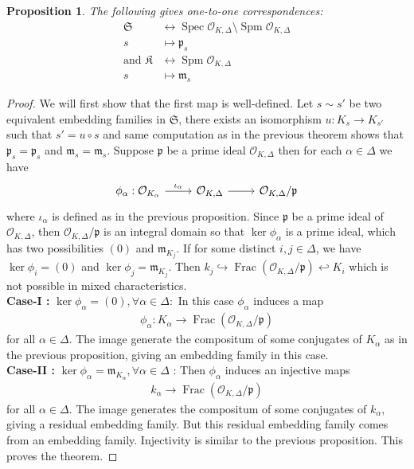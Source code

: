\documentclass[12pts,a4paper]{amsart}
\newtheorem{proposition}{Proposition}[section]
\DeclareMathOperator{\Frac}{Frac}
\DeclareMathOperator{\spm}{Spm}
\DeclareMathOperator{\spec}{Spec}
\begin{document}
\begin{proposition}\label{Prime ideal prop of Delta fields}
	The following gives one-to-one correspondences:
	\begin{align*}
		\mathfrak{S}&\leftrightarrow \spec\mathcal{O}_{K,\Delta}\setminus\spm\mathcal{O}_{K,\Delta}\\
		                  s &\mapsto \mathfrak{p}_s\\
	 \text{and  }	\mathfrak{K}&\leftrightarrow \spm\mathcal{O}_{K,\Delta}\\
		                  s &\mapsto \mathfrak{m}_s
	\end{align*}
\end{proposition}

\begin{proof}
	We will first show that the first map is well-defined. Let $s\sim s'$ be two equivalent embedding families in $\mathfrak{S}$, there exists an isomorphism $u: K_s\to K_{s'}$ such that $s'=u\circ s$ and same computation as in the previous theorem shows that $\mathfrak{p}_s=\mathfrak{p}_s$ and $\mathfrak{m}_s=\mathfrak{m}_s$. Suppose $\mathfrak{p}$ be a prime ideal $\mathcal{O}_{K,\Delta}$ then for each $\alpha\in\Delta$ we have 
	\[
	\begin{tikzcd}
	  \phi_\alpha:\mathcal{O}_{K_\alpha}\arrow[r,"\iota_\alpha"]& \mathcal{O}_{K,\Delta}\arrow[r]& \mathcal{O}_{K,\Delta}/\mathfrak{p}
	\end{tikzcd}
	\]
	where $\iota_\alpha$ is defined as in the previous proposition. Since $\mathfrak{p}$ be a prime ideal of $\mathcal{O}_{K,\Delta}$, then $\mathcal{O}_{K,\Delta}/\mathfrak{p}$ is an integral domain so that $\ker\phi_\alpha$ is a prime ideal, which has two possibilities $(0)$ and $\mathfrak{m}_{K_j}$. If for some distinct $i,j\in\Delta$, we have $\ker\phi_i=(0)$ and $\ker\phi_j=\mathfrak{m}_{K_j}$. Then $k_j\hookrightarrow\Frac(\mathcal{O}_{K,\Delta}/\mathfrak{p})\hookleftarrow K_i$ which is not possible in mixed characteristics.\\
	\textbf{Case-I :} $\ker\phi_\alpha=(0), \forall\alpha\in\Delta:$ In this case $\phi_\alpha$ induces a map
	\begin{align*}
		\phi_\alpha:K_\alpha\to \Frac(\mathcal{O}_{K,\Delta}/\mathfrak{p})
	\end{align*} 
	for all $\alpha\in\Delta$. The image generate the compositum of some conjugates of $K_\alpha$ as in the previous proposition, giving an embedding family in this case.\\
	\textbf{Case-II :} $\ker\phi_\alpha=\mathfrak{m}_{K_\alpha},\forall \alpha\in\Delta$ : Then $\phi_\alpha$ induces an injective maps
	\begin{align*}
		k_\alpha\to \Frac(\mathcal{O}_{K,\Delta}/\mathfrak{p})
	\end{align*}
	for all $\alpha\in\Delta$. The image generates the compositum of some conjugates of $k_\alpha$, giving a residual embedding family. But this residual embedding family comes from an embedding family. Injectivity is similar to the previous proposition. This proves the theorem.
\end{proof}
\end{document}
